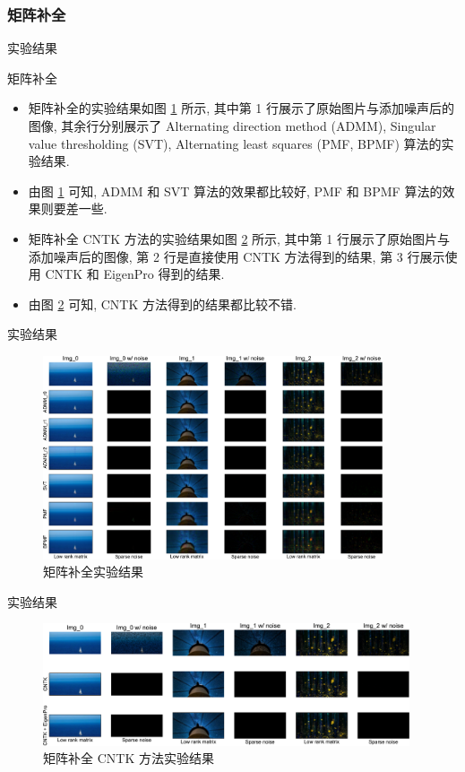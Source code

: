 \documentclass{beamer}
\begin{document}
\subsubsection{矩阵补全}

\begin{frame}{实验结果}
  \begin{block}{矩阵补全}
    \begin{itemize}
      \item 矩阵补全的实验结果如图 \ref{fig:results_mc} 所示, 其中第 1 行展示了原始图片与添加噪声后的图像, 其余行分别展示了 Alternating direction method (ADMM), Singular value thresholding (SVT), Alternating least squares (PMF, BPMF) 算法的实验结果.
      \item 由图 \ref{fig:results_mc} 可知, ADMM 和 SVT 算法的效果都比较好, PMF 和 BPMF 算法的效果则要差一些.
      \item 矩阵补全 CNTK 方法的实验结果如图 \ref{fig:results_mc_ntk} 所示, 其中第 1 行展示了原始图片与添加噪声后的图像, 第 2 行是直接使用 CNTK 方法得到的结果, 第 3 行展示使用 CNTK 和 EigenPro 得到的结果. 
      \item 由图 \ref{fig:results_mc_ntk} 可知, CNTK 方法得到的结果都比较不错.
    \end{itemize}
  \end{block}
\end{frame}

\begin{frame}{实验结果}
  \begin{figure}[H]
    \centering
    \includegraphics[height=6cm]{matrix_completion.pdf}
    \caption{矩阵补全实验结果}
    \label{fig:results_mc}
  \end{figure}
\end{frame}

\begin{frame}{实验结果}
  \begin{figure}[H]
    \centering
    \includegraphics[height=3.6cm]{matrix_completion_ntk.pdf}
    \caption{矩阵补全 CNTK 方法实验结果}
    \label{fig:results_mc_ntk}
  \end{figure}
\end{frame}
\end{document}
